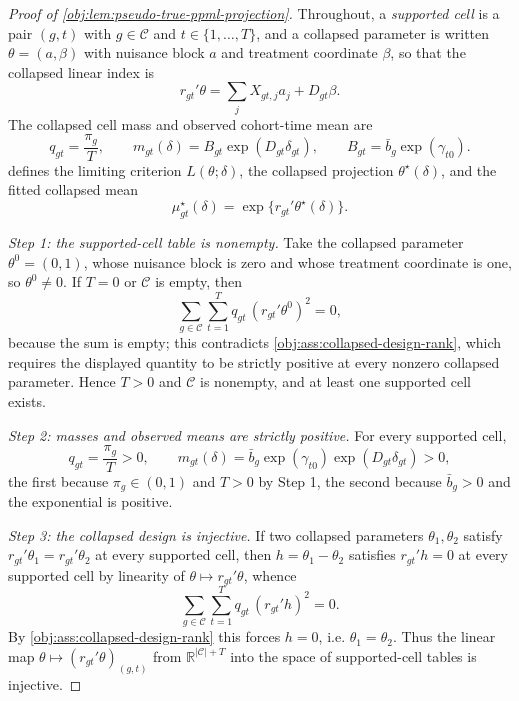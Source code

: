 \begin{proof}[Proof of \cref{obj:lem:pseudo-true-ppml-projection}]
Throughout, a \textit{supported cell} is a pair \((g,t)\) with \(g\in\mathcal C\) and \(t\in\{1,\ldots,T\}\), and a collapsed parameter is written \(\theta=(a,\beta)\) with nuisance block \(a\) and treatment coordinate \(\beta\), so that the collapsed linear index is
\[
r_{gt}'\theta
=
\sum_j X_{gt,j}a_j+D_{gt}\beta .
\]
The collapsed cell mass and observed cohort-time mean are
\[
q_{gt}=\frac{\pi_g}{T},
\qquad
m_{gt}(\delta)=B_{gt}\exp(D_{gt}\delta_{gt}),
\qquad
B_{gt}=\bar b_g\exp(\gamma_{t0}).
\]
 defines the limiting criterion \(L(\theta;\delta)\), the collapsed projection \(\theta^\star(\delta)\), and the fitted collapsed mean
\[
\mu^\star_{gt}(\delta)=\exp\{r_{gt}'\theta^\star(\delta)\}.
\]

\textit{Step 1: the supported-cell table is nonempty.} Take the collapsed parameter \(\theta^{0}=(0,1)\), whose nuisance block is zero and whose treatment coordinate is one, so \(\theta^{0}\neq0\). If \(T=0\) or \(\mathcal C\) is empty, then
\[
\sum_{g\in\mathcal C}\sum_{t=1}^T q_{gt}\,(r_{gt}'\theta^{0})^2=0,
\]
because the sum is empty; this contradicts \cref{obj:ass:collapsed-design-rank}, which requires the displayed quantity to be strictly positive at every nonzero collapsed parameter. Hence \(T>0\) and \(\mathcal C\) is nonempty, and at least one supported cell exists.

\textit{Step 2: masses and observed means are strictly positive.} For every supported cell,
\[
q_{gt}=\frac{\pi_g}{T}>0,
\qquad
m_{gt}(\delta)=\bar b_g\exp(\gamma_{t0})\exp(D_{gt}\delta_{gt})>0,
\]
the first because \(\pi_g\in(0,1)\) and \(T>0\) by Step 1, the second because \(\bar b_g>0\) and the exponential is positive.

\textit{Step 3: the collapsed design is injective.} If two collapsed parameters \(\theta_1,\theta_2\) satisfy \(r_{gt}'\theta_1=r_{gt}'\theta_2\) at every supported cell, then \(h=\theta_1-\theta_2\) satisfies \(r_{gt}'h=0\) at every supported cell by linearity of \(\theta\mapsto r_{gt}'\theta\), whence
\[
\sum_{g\in\mathcal C}\sum_{t=1}^T q_{gt}\,(r_{gt}'h)^2=0 .
\]
By \cref{obj:ass:collapsed-design-rank} this forces \(h=0\), i.e. \(\theta_1=\theta_2\). Thus the linear map \(\theta\mapsto(r_{gt}'\theta)_{(g,t)}\) from \(\mathbb R^{|\mathcal C|+T}\) into the space of supported-cell tables is injective.


\end{proof}
